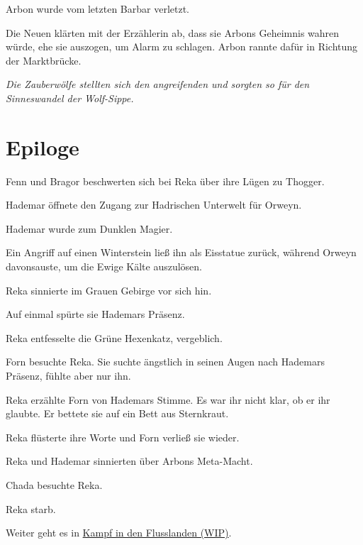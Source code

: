 Arbon wurde vom letzten Barbar verletzt.

Die Neuen  klärten mit der Erzählerin ab, dass sie Arbons Geheimnis wahren würde, ehe sie auszogen, um Alarm zu schlagen. Arbon rannte dafür in Richtung der Marktbrücke.

\trennzeichen

\textit{Die Zauberwölfe stellten sich den angreifenden  und sorgten so für den Sinneswandel der Wolf-Sippe.}






\newpage
\section{Epiloge}


Fenn und Bragor beschwerten sich bei Reka über ihre Lügen zu Thogger.


Hademar öffnete den Zugang zur Hadrischen Unterwelt für Orweyn. 

Hademar wurde zum Dunklen Magier.

Ein Angriff auf einen Winterstein ließ ihn als Eisstatue zurück, während Orweyn davonsauste, um die Ewige Kälte auszulösen.


Reka sinnierte im Grauen Gebirge vor sich hin.

Auf einmal spürte sie Hademars Präsenz.

Reka entfesselte die Grüne Hexenkatz, vergeblich.

Forn besuchte Reka. Sie suchte ängstlich in seinen Augen nach Hademars Präsenz, fühlte aber nur ihn.

Reka erzählte Forn von Hademars Stimme. Es war ihr nicht klar, ob er ihr glaubte. Er bettete sie auf ein Bett aus Sternkraut.

Reka flüsterte ihre Worte und Forn verließ sie wieder.

Reka und Hademar sinnierten über Arbons Meta-Macht.

Chada besuchte Reka.

Reka starb.








\begin{commentbox}
    Weiter geht es in \hyperref[wip-kampf-in-den-flusslanden]{Kampf in den Flusslanden (WIP)}.
\end{commentbox}

